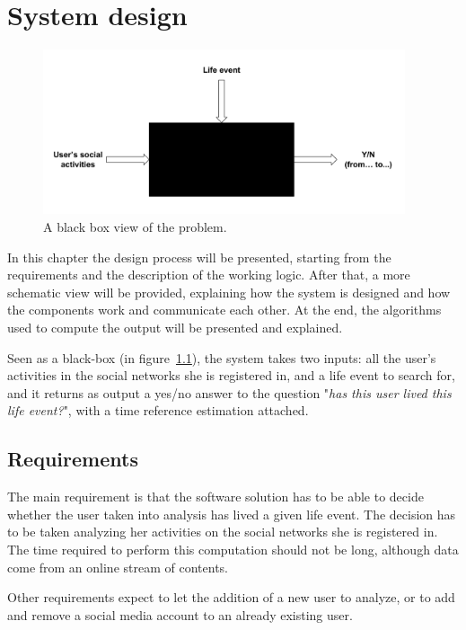 \chapter{System design}
\label{cha:design}

\begin{figure}
\centering
\includegraphics[width=%
0.95\textwidth]{img/bb}
\caption{A black box view of the problem.}
\label{fig:bb}
\end{figure}

In this chapter the design process will be presented, starting from the requirements and the description of the working logic. After that, a more schematic view will be provided, explaining how the system is designed and how the components work and communicate each other. At the end, the algorithms used to compute the output will be presented and explained.

Seen as a black-box (in figure~\ref{fig:bb}), the system takes two inputs: all the user's activities in the social networks she is registered in, and a life event to search for, and it returns as output a yes/no answer to the question "\textit{has this user lived this life event?}", with a time reference estimation attached.

\section{Requirements}

The main requirement is that the software solution has to be able to decide whether the user taken into analysis has lived a given life event. The decision has to be taken analyzing her activities on the social networks she is registered in. The time required to perform this computation should not be long, although data come from an online stream of contents.

Other requirements expect to let the addition of a new user to analyze, or to add and remove a social media account to an already existing user.

